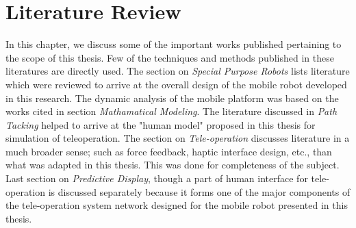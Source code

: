\setcounter{secnumdepth}{4} 
\chapter{Literature Review}
\label{c2_LitRev}

In this chapter, we  discuss some of the important works published pertaining to the scope of this thesis. Few of the techniques and methods published in these literatures are directly used. The section on \textit{Special Purpose Robots} lists literature which were reviewed to arrive at the overall design of the mobile robot developed in this research.
 The dynamic analysis of the mobile platform was based on the works cited in section\textit{ Mathamatical Modeling}. 
 The literature discussed in \textit{Path Tacking } helped to arrive at the "human model" proposed in this thesis for simulation of teleoperation. 
 The section on \textit{Tele-operation} discusses literature in a much broader sense; such as force feedback, haptic interface  design, etc., than what was adapted in this thesis. 
 This was done for completeness of the subject. 
 Last section on \textit{Predictive Display}, though a part of human interface for tele-operation is discussed separately because it forms one of the major components of the tele-operation system network designed  for the mobile robot  presented in this thesis.   

